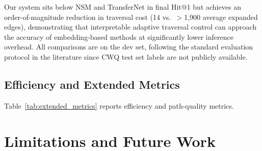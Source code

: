 \documentclass[10pt,conference]{IEEEtran}
\begin{document}
Our system sits below NSM and TransferNet in final Hit@1 but achieves an order-of-magnitude reduction in traversal cost (14 vs.\ $>$1,900 average expanded edges), demonstrating that interpretable adaptive traversal control can approach the accuracy of embedding-based methods at significantly lower inference overhead. All comparisons are on the dev set, following the standard evaluation protocol in the literature since CWQ test set labels are not publicly available.

\subsection{Efficiency and Extended Metrics}

Table~\ref{tab:extended_metrics} reports efficiency and path-quality metrics.

\begin{table}[!ht]
\centering
\caption{Extended performance and efficiency metrics (CWQ dev). RLMC\,=\,Stage~I+II+CDS-DPO; STRL\,=\,Stage~I+STRL+CDS-DPO.}
\label{tab:extended_metrics}
\end{table}


\section{Limitations and Future Work}
\end{document}
